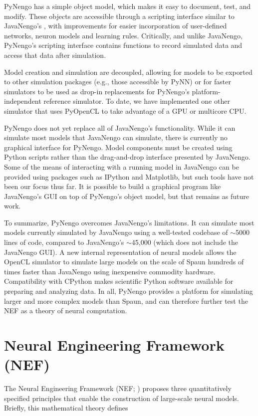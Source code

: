 \documentclass{frontiersSCNS}
\begin{document}
PyNengo has a simple object model,
which makes it easy to
document, test, and modify.
These objects are accessible
through a scripting interface
similar to JavaNengo's \citep{stewart2009},
with improvements
for easier incorporation of user-defined networks,
neuron models and learning rules.
Critically, and unlike JavaNengo,
PyNengo's scripting interface
contains functions to record simulated data
and access that data after simulation.

Model creation and simulation are decoupled,
allowing for models to be exported
to other simulation packages
(e.g., those accessible by PyNN)
or for faster simulators to be used
as drop-in replacements for PyNengo's
platform-independent reference simulator.
To date, we have implemented one other simulator
that uses PyOpenCL to take advantage
of a GPU or multicore CPU.

PyNengo does not yet
replace all of JavaNengo's functionality.
While it can simulate most
models that JavaNengo can simulate,
there is currently no graphical interface for PyNengo.
Model components must be created
using Python scripts rather than
the drag-and-drop interface presented by JavaNengo.
Some of the means of interacting
with a running model in JavaNengo
can be provided using packages
such as IPython and Matplotlib,
but such tools have not been our focus thus far.
It is possible to build a graphical program
like JavaNengo's GUI on top of PyNengo's object model,
but that remains as future work.

To summarize, PyNengo overcomes
JavaNengo's limitations.
It can simulate most models
currently simulated by JavaNengo
using a well-tested codebase of
$\sim$5000 lines of code,
compared to JavaNengo's $\sim$45,000
(which does not include the JavaNengo GUI).
A new internal representation of neural models
allows the OpenCL simulator to simulate
large models on the scale of Spaun
hundreds of times faster than JavaNengo
using inexpensive commodity hardware.
Compatibility with CPython makes scientific Python software
available for preparing and analyzing data.
In all, PyNengo provides a platform for
simulating larger and more complex models than Spaun,
and can therefore further test the NEF
as a theory of neural computation.

\section{Neural Engineering Framework (NEF)}

The Neural Engineering Framework (NEF; \citealp{eliasmith2003})
proposes three quantitatively specified principles
that enable the construction
of large-scale neural models.
Briefly, this mathematical theory defines
\end{document}
